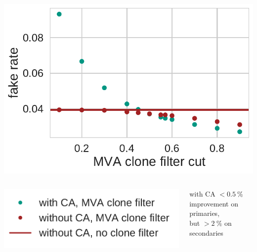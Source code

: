 \documentclass[18pt, aspectratio=169]{beamer}
\begin{document}
\begin{frame}
\begin{columns}
\begin{column}{0.3\textwidth}
      \includegraphics[width=1.0\textwidth]{figures/ca_fake_rate_fullreco.pdf}
    \end{column}
  \end{columns}
  \begin{columns}
    \begin{column}{.4\textwidth}
      \includegraphics[width=.7\textwidth]{figures/legend_ca_fom_fullreco.pdf}
    \end{column}
    \begin{column}{.6\textwidth}
       with CA $< \SI{0.5}{\percent}$ improvement on primaries,\\but $> \SI{2}{\percent}$ on secondaries
    \end{column}
  \end{columns}
\end{frame}
\end{document}
